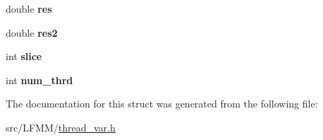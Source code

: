 \begin{DoxyCompactItemize}
\item 
\hypertarget{struct__mat_a7f30df6f76d596ce2f902e7681324d93}{double {\bfseries res}}\label{struct__mat_a7f30df6f76d596ce2f902e7681324d93}

\item 
\hypertarget{struct__mat_ab6b754879560f5b47eac3b4f314fd283}{double {\bfseries res2}}\label{struct__mat_ab6b754879560f5b47eac3b4f314fd283}

\item 
\hypertarget{struct__mat_a86e813c6a00e49a57792406682dd98d5}{int {\bfseries slice}}\label{struct__mat_a86e813c6a00e49a57792406682dd98d5}

\item 
\hypertarget{struct__mat_a0f76b9d65756c015db9ede46ae4dffaa}{int {\bfseries num\-\_\-thrd}}\label{struct__mat_a0f76b9d65756c015db9ede46ae4dffaa}

\end{DoxyCompactItemize}


\-The documentation for this struct was generated from the following file\-:\begin{DoxyCompactItemize}
\item 
src/\-L\-F\-M\-M/\hyperlink{thread__var_8h}{thread\-\_\-var.\-h}\end{DoxyCompactItemize}
